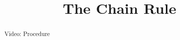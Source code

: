 \documentclass[handout]{ximera}
\title{The Chain Rule}
\begin{document}
\begin{abstract} Video: Procedure %
\end{abstract}

\maketitle

\end{document}
